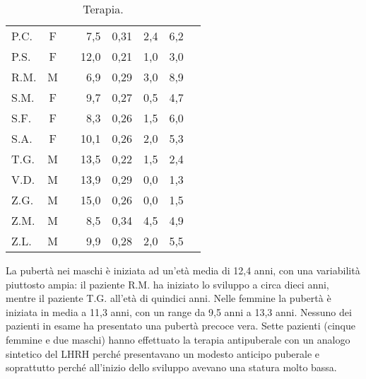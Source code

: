 \begin{table}[!h]
\begin{center}
\begin{tabular}{lccrcccl}
P.C.	& F &  		 & 7,5   	&  0,31     	& 2,4                 & 6,2  \\
P.S.	& F &  		 & 12,0  	&  0,21     	& 1,0                 & 3,0  \\
R.M.	& M & \checkmark & 6,9   	&  0,29     	& 3,0                 & 8,9  \\
S.M.	& F &  	  	 & 9,7   	&  0,27     	& 0,5                 & 4,7  \\
S.F.	& F &  		 & 8,3   	&  0,26     	& 1,5                 & 6,0  \\
S.A.	& F &  		 & 10,1  	&  0,26     	& 2,0                 & 5,3  \\
T.G.    & M &            & 13,5         &  0,22         & 1,5                 & 2,4  \\
V.D.	& M &  		 & 13,9  	&  0,29     	& 0,0                 & 1,3  \\
Z.G.	& M &  		 & 15,0  	&  0,26     	& 0,0                 & 1,5  \\
Z.M.	& M &  		 & 8,5   	&  0,34     	& 4,5                 & 4,9  \\
Z.L.	& M &  		 & 9,9   	&  0,28     	& 2,0                 & 5,5  \\
\bottomrule
\end{tabular}
\end{center}
\caption{Terapia.}
\label{tab:Terapia}
\end{table}

La pubertà nei maschi è iniziata ad un'età media di 12,4 anni, con una variabilità piuttosto ampia: il paziente R.M. ha iniziato lo sviluppo a circa dieci anni, mentre il paziente T.G. all'età di quindici anni. Nelle femmine la pubertà è iniziata in media a 11,3 anni, con un range da 9,5 anni a 13,3 anni. Nessuno dei pazienti in esame ha presentato una pubertà precoce vera. Sette pazienti (cinque femmine e due maschi) hanno effettuato la terapia antipuberale con un analogo sintetico del LHRH perché presentavano un modesto anticipo puberale e soprattutto perché all'inizio dello sviluppo avevano una statura molto bassa.
 
